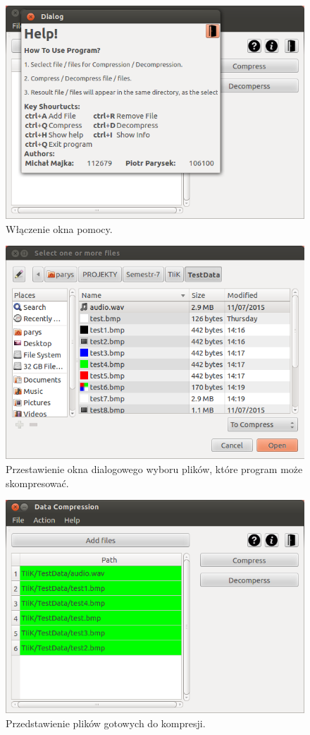 \documentclass[12pt,a4paper,notitlepage]{report}
\begin{document}
\begin{figure}[H]
	\centering
	\includegraphics[scale=.7]{help}
	\caption{Włączenie okna pomocy.}
\end{figure}
\begin{figure}[H]
	\centering
	\includegraphics[scale=.7]{take}
	\caption{Przestawienie okna dialogowego wyboru plików, które program może skompresować.}
\end{figure}
\begin{figure}[H]
	\centering
	\includegraphics[scale=.7]{com}
	\caption{Przedstawienie plików gotowych do kompresji.}
\end{figure}
\end{document}

